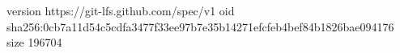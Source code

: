 version https://git-lfs.github.com/spec/v1
oid sha256:0cb7a11d54c5cdfa3477f33ee97b7e35b14271efcfeb4bef84b1826bae094176
size 196704
